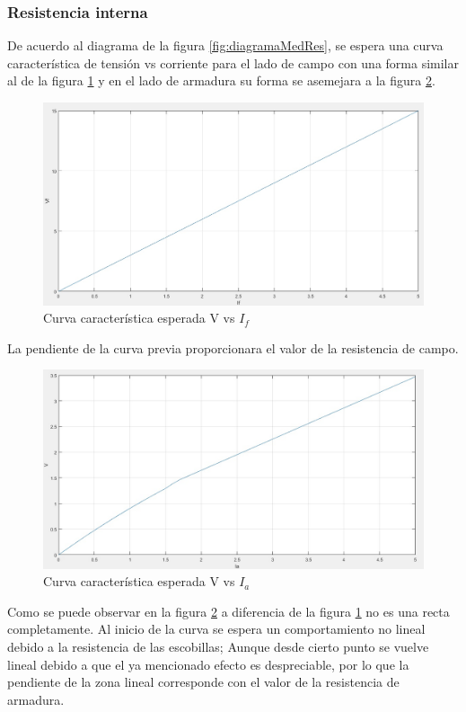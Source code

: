 \documentclass[11pt,letterpaper]{article}     %
\begin{document}
\subsubsection{Resistencia interna }
De acuerdo al diagrama de la figura \ref{fig:diagramaMedRes}, se espera una curva característica de tensión vs corriente para el lado de campo con una forma similar al de la figura \ref{fig:curvaCaractPreVILadoCampo} y en el lado de armadura su forma se asemejara a la figura \ref{fig:curvaCaractPreVILadoArmadura}.
\begin{figure}[H]
    \centering
    \includegraphics[scale=0.5]{./recursos-Lab6/curvaCaractPreVILadoCampo.jpg}
    \caption{Curva característica esperada V vs $I_{f}$}
    \label{fig:curvaCaractPreVILadoCampo}
\end{figure}
La pendiente de la curva previa proporcionara el valor de la resistencia de campo.
\begin{figure}[H]
    \centering
    \includegraphics[scale=0.5]{./recursos-Lab6/curvaCaractPreVILadoArmadura.jpg}
    \caption{Curva característica esperada V vs $I_{a}$}
    \label{fig:curvaCaractPreVILadoArmadura}
\end{figure} 
Como se puede observar en la figura \ref{fig:curvaCaractPreVILadoArmadura} a diferencia de la figura \ref{fig:curvaCaractPreVILadoCampo} no es una recta completamente. Al inicio de la curva se espera un comportamiento no lineal debido a la resistencia de las escobillas; Aunque desde cierto punto se vuelve lineal debido a que el ya mencionado efecto es despreciable, por lo que la pendiente de la zona lineal corresponde con el valor de la resistencia de armadura. 
\end{document}
